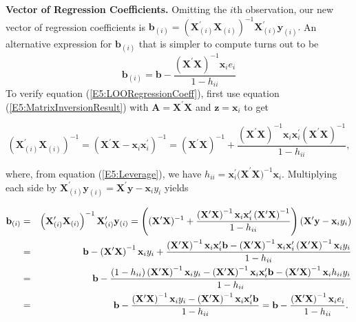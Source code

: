 \textbf{Vector of Regression Coefficients.} Omitting the $i$th
observation, our new vector of regression coefficients is $
\mathbf{b}_{(i)}=\left(
\mathbf{X}_{(i)}^{\prime}\mathbf{X}_{(i)}\right)
^{-1}\mathbf{X}_{(i)}^{\prime}\mathbf{y}_{(i)}. $ An alternative
expression for $\mathbf{b}_{(i)}$ that is simpler to compute turns
out to be
\begin{equation}\label{E5:LOORegressionCoeff}
\mathbf{b}_{(i)}=\mathbf{b}-\frac{\left( \mathbf{X}^{\prime}\mathbf{X}%
\right) ^{-1}\mathbf{x}_i e_i}{1-h_{ii}}
\end{equation}
To verify equation (\ref{E5:LOORegressionCoeff}), first use equation
(\ref{E5:MatrixInversionResult}) with
$\mathbf{A}=\mathbf{X}^{\prime}\mathbf{X}$ and
$\mathbf{z}=\mathbf{x}_i$ to get
\begin{center}
\[
\left( \mathbf{X}_{(i)}^{\prime}\mathbf{X}_{(i)}\right)
^{-1}=(\mathbf{X}
^{\prime}\mathbf{X-x}_i\mathbf{x}_i^{\prime})^{-1}=
(\mathbf{X}^{\prime}\mathbf{X})^{-1}+\frac{\left(
\mathbf{X}^{\prime}\mathbf{X}\right) ^{-1}
\mathbf{x}_i\mathbf{x}_i^{\prime}\left(
\mathbf{X}^{\prime}\mathbf{X} \right) ^{-1}}{1-h_{ii}},
\]
\end{center}
where, from equation (\ref{E5:Leverage}), we have
$h_{ii}=\mathbf{x}_i^{\prime}
\mathbf{(X}^{\prime}\mathbf{X)}^{-1}\mathbf{x}_i$. Multiplying each
side by
$\mathbf{X}_{(i)}^{\prime}\mathbf{y}_{(i)}=\mathbf{X}^{\prime}\mathbf{y}
-\mathbf{x}_i y_i$ yields

\begin{center}
\begin{eqnarray*}
\mathbf{b}_{(i)} &=&\left(
\mathbf{X}_{(i)}^{\prime}\mathbf{X}_{(i)}\right)
^{-1}\mathbf{X}_{(i)}^{\prime}\mathbf{y}_{(i)}=\left( (\mathbf{X}^{\prime}%
\mathbf{X})^{-1}+\frac{\left( \mathbf{X}^{\prime}\mathbf{X}\right) ^{-1}%
\mathbf{x}_i\mathbf{x}_i^{\prime}\left( \mathbf{X}^{\prime}\mathbf{X}%
\right) ^{-1}}{1-h_{ii}}\right) \left( \mathbf{X}^{\prime}\mathbf{y}-%
\mathbf{x}_iy_i\right)  \\
&=&\mathbf{b}-\left( \mathbf{X}^{\prime}\mathbf{X}\right) ^{-1}\mathbf{x}%
_iy_i+\frac{\left( \mathbf{X}^{\prime}\mathbf{X}\right) ^{-1}\mathbf{x}%
_i\mathbf{x}_i^{\prime}\mathbf{b}-\left( \mathbf{X}^{\prime}\mathbf{X}%
\right) ^{-1}\mathbf{x}_i\mathbf{x}_i^{\prime}\left(
\mathbf{X}^{\prime}\mathbf{X}\right) ^{-1}\mathbf{x}_iy_i}{1-h_{ii}} \\
&=&\mathbf{b}-\frac{\left( 1-h_{ii}\right) \left( \mathbf{X}^{\prime}%
\mathbf{X}\right) ^{-1}\mathbf{x}_iy_i-\left( \mathbf{X}^{\prime}%
\mathbf{X}\right) ^{-1}\mathbf{x}_i\mathbf{x}_i^{\prime}\mathbf{b}%
-\left( \mathbf{X}^{\prime}\mathbf{X}\right) ^{-1}\mathbf{x}_ih_{ii}y_i%
}{1-h_{ii}} \\
&=&\mathbf{b}-\frac{\left( \mathbf{X}^{\prime}\mathbf{X}\right) ^{-1}%
\mathbf{x}_iy_i-\left( \mathbf{X}^{\prime}\mathbf{X}\right) ^{-1}%
\mathbf{x}_i\mathbf{x}_i^{\prime}\mathbf{b}}{1-h_{ii}}=\mathbf{b}-\frac{%
\left( \mathbf{X}^{\prime}\mathbf{X}\right) ^{-1}\mathbf{x}_i e_i}{%
1-h_{ii}}.\text{ }
\end{eqnarray*}%
\qquad
\end{center}

